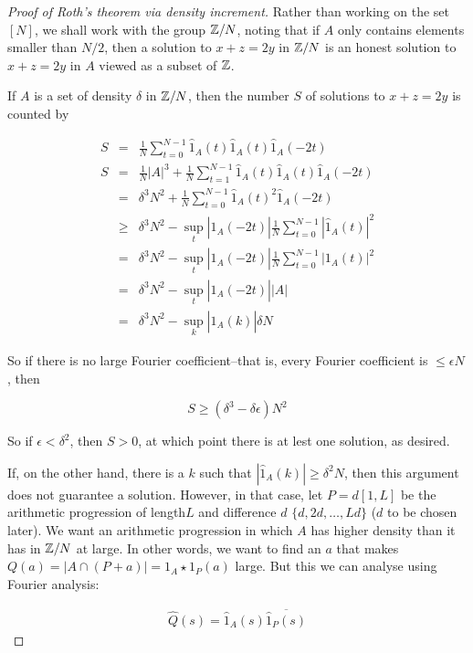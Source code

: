 \documentclass{article}
\theoremstyle{definition}
\theoremstyle{remark}
\numberwithin{equation}{section}
\begin{document}
\begin{proof}[Proof of Roth's theorem via density increment]

  Rather than working on the set $[N]$, we shall work with the group
  $\mathbb{Z}/N$, noting that if $A$ only contains elements smaller than
  $N/2$, then a solution to $x+z=2y$ in $\mathbb{Z}/N$ is an honest solution
  to $x+z=2y$ in $A$ viewed as a subset of $\mathbb{Z}$.  

  If $A$ is a set of density $\delta$ in $\mathbb{Z}/N$, then the number $S$
  of solutions to $x+z=2y$ is counted by

  \begin{eqnarray*}
    S &=& \frac1N \sum_{t=0}^{N-1} \hat 1_A(t)\hat 1_A(t)\hat 1_A(-2t) \\
    S &=& \frac1N |A|^3 + \frac1N \sum_{t=1}^{N-1} \hat 1_A(t)\hat 1_A(t)\hat 1_A(-2t) \\
      &=& \delta^3 N^2 + \frac1N \sum_{t=0}^{N-1} \hat 1_A(t)^2\hat 1_A(-2t) \\
      &\geq& \delta^3 N^2 - \sup_t |\hat 1_A(-2t)| \frac1N \sum_{t=0}^{N-1} |\hat 1_A(t)|^2 \\
      &=& \delta^3 N^2 - \sup_t |\hat 1_A(-2t)| \frac1N \sum_{t=0}^{N-1} |1_A(t)|^2 \\
      &=& \delta^3 N^2 - \sup_t |\hat 1_A(-2t)| |A|\\
      &=& \delta^3 N^2 - \sup_k |\hat 1_A(k)| \delta N
  \end{eqnarray*}

  So if there is no large Fourier coefficient--that is, every Fourier
  coefficient is $\leq \epsilon N$, then
  
  \[S \geq (\delta^3 - \delta\epsilon) N^2\]

  So if $\epsilon < \delta^2$, then $S > 0$, at which point there is at
  lest one solution, as desired.  
  
  If, on the other hand, there is a $k$ such that
  $|\hat 1_A(k)| \geq \delta^2 N$, then this argument does not
  guarantee a solution.  However, in that case, let $P = d[1,L]$ be
  the arithmetic progression of length$L$ and difference $d$
  $\{d, 2d, \ldots ,Ld\}$ ($d$ to be chosen later).  We want an
  arithmetic progression in which $A$ has higher density than it has
  in $\mathbb{Z}/N$ at large.  In other words, we want to find an $a$ that
  makes $Q(a) = |A \cap (P+a)| = 1_A \star 1_P(a)$ large.  But this we
  can analyse using Fourier analysis:
  
  \begin{eqnarray*}
    \hat Q(s) = \hat 1_A(s) \overline{\hat 1_P(s)}
  \end{eqnarray*}
  

\end{proof}
\end{document}
